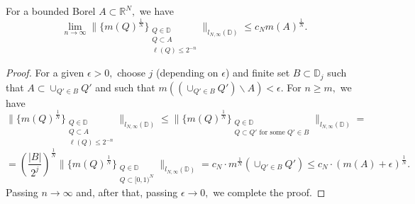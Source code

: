 \documentclass{amsart}
\begin{document}
\begin{lemma}\label{first RS convergence for sets} For a bounded Borel $A\subset\mathbb{R}^N,$ we have
$$\lim_{n\to\infty}\Big\|\Big\{m(Q)^{\frac1N}\Big\}_{\substack{Q\in\mathbb{D}\\ Q\subset A\\ \ell(Q)\leq 2^{-n}}}\Big\|_{l_{N,\infty}(\mathbb{D})}\leq c_Nm(A)^{\frac1N}.$$
\end{lemma}
\begin{proof} For a given $\epsilon>0,$ choose $j$ (depending on $\epsilon$) and finite set $B\subset\mathbb{D}_j$ such that $A\subset \cup_{Q'\in B}Q'$ and such that $m((\cup_{Q'\in B}Q')\backslash A)<\epsilon.$ For $n\geq m,$ we have
$$\Big\|\Big\{m(Q)^{\frac1N}\Big\}_{\substack{Q\in\mathbb{D}\\ Q\subset A\\ \ell(Q)\leq 2^{-n}}}\Big\|_{l_{N,\infty}(\mathbb{D})}\leq\Big\|\Big\{m(Q)^{\frac1N}\Big\}_{\substack{Q\in\mathbb{D}\\ Q\subset Q'\mbox{ for some }Q'\in B}}\Big\|_{l_{N,\infty}(\mathbb{D})}=$$
$$=(\frac{|B|}{2^j})^{\frac1N}\Big\|\Big\{m(Q)^{\frac1N}\Big\}_{\substack{Q\in\mathbb{D}\\ Q\subset [0,1)^N}}\Big\|_{l_{N,\infty}(\mathbb{D})}=c_N\cdot m^{\frac1N}(\cup_{Q'\in B}Q')\leq c_N\cdot (m(A)+\epsilon)^{\frac1N}.$$
Passing $n\to\infty$ and, after that, passing $\epsilon\to0,$ we complete the proof.
\end{proof}
\end{document}
